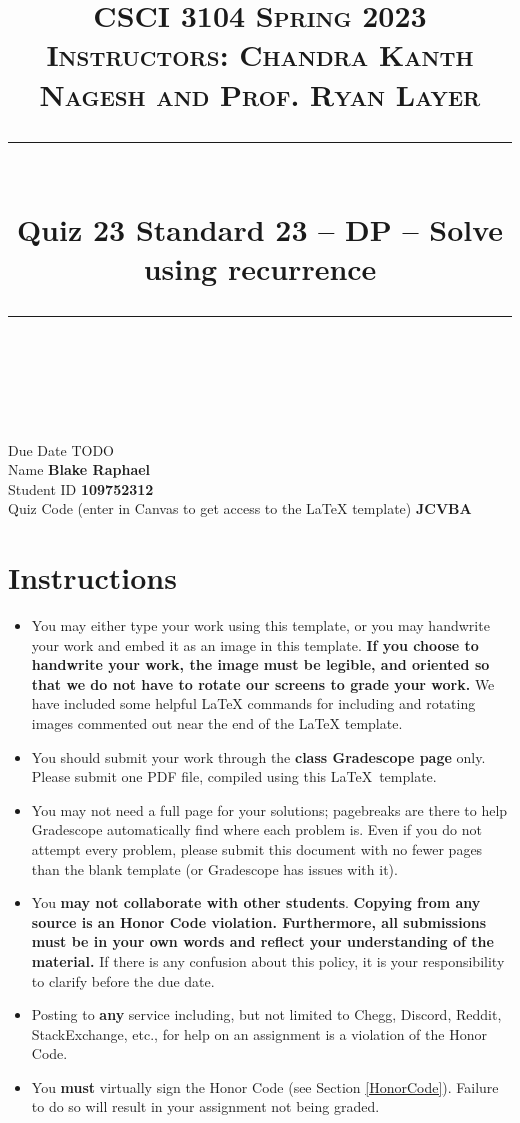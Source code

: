 \documentclass[11pt]{article}
\title{
\normalfont \normalsize 
\textsc{CSCI 3104 Spring 2023 \\ 
Instructors: Chandra Kanth Nagesh and Prof. Ryan Layer} \\
[10pt] 
\rule{\linewidth}{0.5pt} \\[6pt] 
\huge Quiz 23 Standard 23 --  DP -- Solve using recurrence \\
\rule{\linewidth}{2pt}  \\[10pt]
}
\date{}
\theoremstyle{definition}
\theoremstyle{definition}
\theoremstyle{definition}
\begin{document}

\maketitle


\noindent
Due Date \dotfill TODO \\
Name \dotfill \textbf{Blake Raphael} \\
Student ID \dotfill \textbf{109752312} \\
Quiz Code (enter in Canvas to get access to the LaTeX template) \dotfill \textbf{JCVBA}


\tableofcontents

\section*{Instructions}
 \begin{itemize}
	\item You may either type your work using this template, or you may handwrite your work and embed it as an image in this template. \textbf{If you choose to handwrite your work, the image must be legible, and oriented so that we do not have to rotate our screens to grade your work.} We have included some helpful LaTeX commands for including and rotating images commented out near the end of the LaTeX template.
	\item You should submit your work through the \textbf{class Gradescope page} only. Please submit one PDF file, compiled using this \LaTeX \ template.
	\item You may not need a full page for your solutions; pagebreaks are there to help Gradescope automatically find where each problem is. Even if you do not attempt every problem, please submit this document with no fewer pages than the blank template (or Gradescope has issues with it).

	\item You \textbf{may not collaborate with other students}. \textbf{Copying from any source is an Honor Code violation. Furthermore, all submissions must be in your own words and reflect your understanding of the material.} If there is any confusion about this policy, it is your responsibility to clarify before the due date. 

	\item Posting to \textbf{any} service including, but not limited to Chegg, Discord, Reddit, StackExchange, etc., for help on an assignment is a violation of the Honor Code.

	\item You \textbf{must} virtually sign the Honor Code (see Section \ref{HonorCode}). Failure to do so will result in your assignment not being graded.
\end{itemize}
\end{document}
